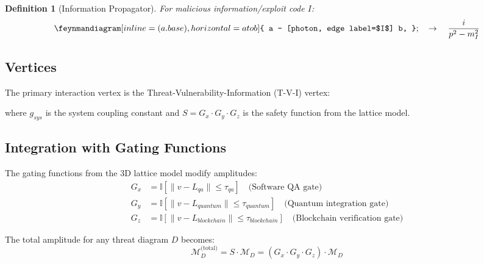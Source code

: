 \documentclass[11pt,a4paper]{article}
\newtheorem{definition}{Definition}
\begin{document}
\begin{definition}[Information Propagator]
For malicious information/exploit code $I$:
\begin{equation}
\feynmandiagram [inline=(a.base), horizontal=a to b] {
  a -- [photon, edge label=$I$] b,
};
\quad \rightarrow \quad \frac{i}{p^2 - m_I^2}
\end{equation}
\end{definition}

\subsection{Vertices}

The primary interaction vertex is the Threat-Vulnerability-Information (T-V-I) vertex:

\begin{center}
\end{center}

where $g_{sys}$ is the system coupling constant and $S = G_x \cdot G_y \cdot G_z$ is the safety function from the lattice model.

\subsection{Integration with Gating Functions}

The gating functions from the 3D lattice model modify amplitudes:
\begin{align}
G_x &= \mathbb{I}[\|v - L_{qa}\| \leq \tau_{qa}] \quad \text{(Software QA gate)} \\
G_y &= \mathbb{I}[\|v - L_{quantum}\| \leq \tau_{quantum}] \quad \text{(Quantum integration gate)} \\
G_z &= \mathbb{I}[\|v - L_{blockchain}\| \leq \tau_{blockchain}] \quad \text{(Blockchain verification gate)}
\end{align}

The total amplitude for any threat diagram $D$ becomes:
\begin{equation}
\mathcal{M}_D^{\text{(total)}} = S \cdot \mathcal{M}_D = (G_x \cdot G_y \cdot G_z) \cdot \mathcal{M}_D
\end{equation}
\end{document}
